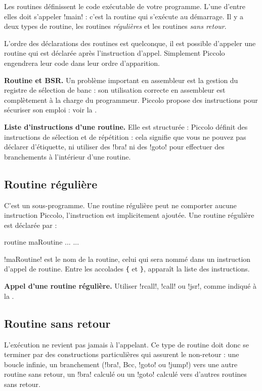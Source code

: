 Les routines définissent le code exécutable de votre programme. L’une d’entre elles doit s’appeler \pic!main! : c’est la routine qui s’exécute au démarrage. Il y a deux types de routine, les routines \emph{régulières} et les routines \emph{sans retour}.


L’ordre des déclarations des routines est quelconque, il est possible d’appeler une routine qui est déclarée après l’instruction d’appel. Simplement Piccolo engendrera leur code dans leur ordre d’apparition. 

\textbf{Routine et BSR.} Un problème important en assembleur est la gestion du registre de sélection de banc  : son utilisation correcte en assembleur est complètement à la charge du programmeur. Piccolo propose des instructions pour sécuriser son emploi : voir la .

\textbf{Liste d’instructions d’une routine.} Elle est structurée : Piccolo définit des instructions de sélection et de répétition : cela signifie que vous ne pouvez pas déclarer d’étiquette, ni utiliser des \pic!bra! ni des \pic!goto! pour effectuer des branchements à l’intérieur d’une routine.


\subsection{Routine régulière}

C'est un sous-programme. Une routine régulière peut ne comporter aucune instruction Piccolo, l'instruction  est implicitement ajoutée. Une routine régulière est déclarée par :
\begin{piccolo}
routine maRoutine ... {
  ...
}
\end{piccolo}

\pic!maRoutine! est le nom de la routine, celui qui sera nommé dans un instruction d’appel de routine. Entre les accolades \texttt{\{} et \texttt{\}}, apparaît la liste des instructions.

\textbf{Appel d’une routine régulière.} Utiliser \pic!rcall!, \pic!call! ou \pic!jsr!, comme indiqué à la .

\subsection{Routine sans retour}

L’exécution ne revient pas jamais à l’appelant. Ce type de routine doit donc se terminer par des constructions particulières qui assurent le non-retour : une boucle infinie, un branchement (\pic!bra!, Bcc, \pic!goto! ou \pic!jump!) vers une autre routine sans retour, un \pic!bra! calculé ou un \pic!goto! calculé vers d’autres routines sans retour.

